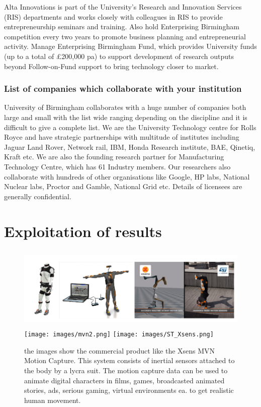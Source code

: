 \documentclass[12pt,a4paper,twoside]{article}
\begin{document}
Alta Innovations is part of the University’s Research and Innovation Services (RIS) departments and works closely with colleagues in RIS to provide entrepreneurship seminars and training.  Also hold Enterprising Birmingham competition every two years to promote business planning and entrepreneurial activity.  Manage Enterprising Birmingham Fund, which provides University funds (up to a total of £200,000 pa) to support development of research outputs beyond Follow-on-Fund support to bring technology closer to market.

\subsubsection{List of companies which collaborate with your institution}
University of Birmingham collaborates with a huge number of companies both large and small with the list wide ranging depending on the discipline and it is difficult to give a complete list. We are the University Technology centre for Rolls Royce and have strategic partnerships with multitude of institutes including Jaguar Land Rover, Network rail, IBM, Honda Research institute, BAE, Qinetiq, Kraft etc. We are also the founding research partner for Manufacturing Technology Centre, which has 61 Industry members. Our researchers also collaborate with hundreds of other organisations like Google, HP labs, National Nuclear labs, Proctor and Gamble, National Grid etc.  Details of licensees are generally confidential.  

\section{Exploitation of results} \label{sec:exploit}

\begin{figure} 
\begin{center}
\includegraphics[height=4cm]{images/mvn.png} \texttt{[image: images/mvn2.png]} \texttt{[image: images/ST\_Xsens.png]}
\caption{the images show the commercial product like the Xsens MVN Motion Capture. This system consists of inertial sensors attached to the body by a lycra suit. The motion capture data can be used to animate digital characters in films, games, broadcasted animated stories, ads, serious gaming, virtual environments ea. to get realistic human movement.}\label{fig:xsens}
\end{center}
\end{figure}
\end{document}
